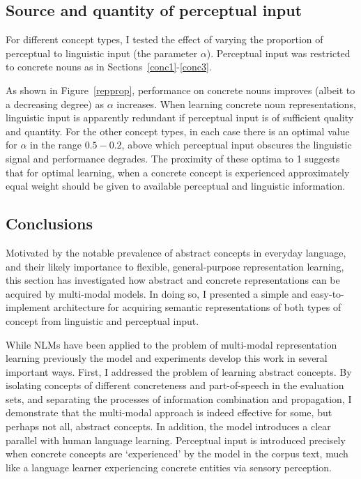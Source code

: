 \subsection{Source and quantity of perceptual input} For different concept types, I tested the effect of varying the proportion of perceptual to linguistic input (the parameter \(\alpha\)). Perceptual input was restricted to concrete nouns as in Sections~\ref{conc1}-\ref{conc3}.

As shown in Figure~\ref{repprop}, performance on concrete nouns improves (albeit to a decreasing degree) as \( \alpha \) increases. When learning concrete noun representations, linguistic input is apparently redundant if perceptual input is of sufficient quality and quantity. For the other concept types, in each case there is an optimal value for \( \alpha \) in the range \(0.5 - 0.2\), above which perceptual input obscures the linguistic signal and performance degrades. The proximity of these optima to 1 suggests that  for optimal learning, when a concrete concept is experienced approximately equal weight should be given to available perceptual and linguistic information. 

\subsection{Conclusions}

Motivated by the notable prevalence of abstract concepts in everyday language, and their likely importance to flexible, general-purpose representation learning, this section has investigated how abstract and concrete representations can be acquired by multi-modal models. In doing so, I presented a simple and easy-to-implement architecture for acquiring semantic representations of both types of concept from linguistic and perceptual input. 

While NLMs have been applied to the problem of multi-modal representation learning previously \citep{srivastava2012multimodal,wu2013online} the model and experiments develop this work in several important ways. First, I addressed the problem of learning abstract concepts. By isolating concepts of different concreteness and part-of-speech in the evaluation sets, and separating the processes of information combination and propagation, I demonstrate that the multi-modal approach is indeed effective for some, but perhaps not all, abstract concepts. In addition, the model introduces a clear parallel with human language learning. Perceptual input is introduced precisely when concrete concepts are `experienced' by the model in the corpus text, much like a language learner experiencing concrete entities via sensory perception.  

